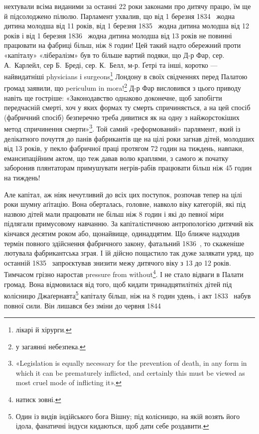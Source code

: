 \parcont{}  %
нехтували всіма виданими за останні 22 роки законами про дитячу
працю, їм ще й підсолоджено пілюлю. Парламент ухвалив, що
від 1 березня 1834~ жодна дитина молодша від 11 років, від
1 березня 1835~ жодна дитина молодша від 12 років і від 1 березня
1836~ жодна дитина молодша від 13 років не повинні
працювати на фабриці більш, ніж 8 годин! Цей такий надто обережний
проти «капіталу» «лібералізм» був то більше вартий
подяки, що Д-р Фар, сер. А.~Карлейл, сер Б.~Бреді, сер. К.~Белл,
м-р. Ґетрі та інші, коротко — найвидатніші physicians і surgeons\footnote*{
лікарі й хірурги. 
} Лондону в своїх свідченнях перед Палатою громад заявили, що
periculum in mora!\footnote*{
у загаянні небезпека. 
} Д-р Фар висловився з цього приводу навіть
ще гостріше: «Законодавство однаково доконечне, щоб запобігти
передчасній смерті, хоч у яких формах ту смерть спричиняється,
а на цей спосіб (фабричний спосіб) безперечно треба дивитися
як на одну з найжорстокіших метод спричинення смерти»\footnote{
«Legislation is equally necessary for the prevention of death, in
any form in which it can be prematurely inflicted, and certainly this must
be viewed as most cruel mode of inflicting it».
}.
Той самий «реформований» парлямент, який із делікатного почуття
до панів фабрикантів ще на цілі роки загнав дітей, молодших
від 13 років, у пекло фабричної праці протягом 72 годин на
тиждень, навпаки, емансипаційним актом, що теж давав волю
краплями, з самого ж початку заборонив плянтаторам примушувати
негрів-рабів працювати більш ніж 45 годин на тиждень!

Але капітал, аж ніяк нечутливий до всіх цих поступок, розпочав
тепер на цілі роки шумну аґітацію. Вона оберталась, головне,
навколо віку категорій, які під назвою дітей мали працювати
не більш ніж 8 годин і які до певної міри підлягали примусовому
навчанню. За капіталістичною антропологією дитячий
вік кінчався десятим роком або, щонайвище, одинадцятим. Що
ближче надходив термін повного здійснення фабричного закону,
фатальний 1836~, то скаженіше лютувала фабрикантська зграя.
І їй дійсно пощастило так дуже залякати уряд, що останній
1835~ запроєктував знизити межу дитячого віку з 13 до 12 років.
Тимчасом грізно наростав pressure from without\footnote*{
натиск зовні. 
}. І не стало відваги
в Палати громад. Вона відмовилася від того, щоб кидати
тринадцятилітніх дітей під колісницю Джаґернавта\footnote*{
Один із видів індійського бога Вішну; під колісницю, на якій возять
його ідола, фанатичні індуси кидаються, щоб дати себе роздавити. 
} капіталу
більш, ніж на 8 годин удень, і акт 1833~ набув повної сили.
Він лишався без зміни до червня 1844~

